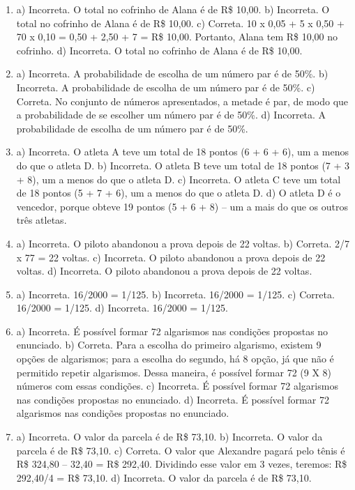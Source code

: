 \begin{enumerate}
\item
a) Incorreta. O total no cofrinho de Alana é de R\$ 10,00.
b) Incorreta. O total no cofrinho de Alana é de R\$ 10,00.
c) Correta. 10 x 0,05 + 5 x 0,50 + 70 x 0,10 = 0,50 + 2,50 + 7 = R\$ 10,00. Portanto, Alana tem R\$ 10,00 no cofrinho.
d) Incorreta. O total no cofrinho de Alana é de R\$ 10,00.

\item
a) Incorreta. A probabilidade de escolha de um número par é de 50\%.
b) Incorreta. A probabilidade de escolha de um número par é de 50\%. 
c) Correta. No conjunto de números apresentados, a metade é par, 
de modo que a probabilidade de se escolher um número par é de 50\%.
d) Incorreta. A probabilidade de escolha de um número par é de 50\%.

\item
a) Incorreta. O atleta A teve um total de 18 pontos (6 + 6 + 6), um a menos do que o atleta D.
b) Incorreta. O atleta B teve um total de 18 pontos (7 + 3 + 8), um a menos do que o atleta D.
c) Incorreta. O atleta C teve um total de 18 pontos (5 + 7 + 6), um a menos do que o atleta D.
d) O atleta D é o vencedor, porque obteve 19 pontos (5 + 6 + 8) -- um a mais do que os outros três atletas.

\item
a) Incorreta. O piloto abandonou a prova depois de 22 voltas.
b) Correta. 2/7 x 77 = 22 voltas.
c) Incorreta. O piloto abandonou a prova depois de 22 voltas.
d) Incorreta. O piloto abandonou a prova depois de 22 voltas.

\item
a) Incorreta. 16/2000 = 1/125.
b) Incorreta. 16/2000 = 1/125.
c) Correta. 16/2000 = 1/125.
d) Incorreta. 16/2000 = 1/125.

\item
a) Incorreta. É possível formar 72 algarismos nas condições propostas
no enunciado. 
b) Correta. Para a escolha do primeiro algarismo, existem 9
opções de algarismos; para a escolha do segundo, há 8 opção, já que
não é permitido repetir algarismos. Dessa maneira, é possível formar 72
(9 X 8) números com essas condições.
c) Incorreta. É possível formar 72 algarismos nas condições propostas
no enunciado.
d) Incorreta. É possível formar 72 algarismos nas condições propostas
no enunciado.

\item
a) Incorreta. O valor da parcela é de R\$ 73,10.
b) Incorreta. O valor da parcela é de R\$ 73,10. 
c) Correta. O valor que Alexandre pagará pelo tênis é R\$ 324,80 -- 32,40
= R\$ 292,40. Dividindo esse valor em 3 vezes, teremos: R\$ 292,40/4 = 
R\$ 73,10.
d) Incorreta. O valor da parcela é de R\$ 73,10.


\end{enumerate}
